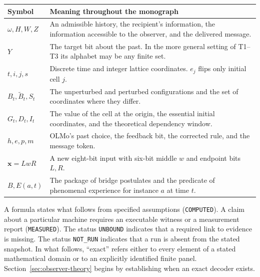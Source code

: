 \begin{center}\small
\begin{tabularx}{\linewidth}{@{}lX@{}}\toprule
Symbol & Meaning throughout the monograph \\\midrule
$\omega,H,W,Z$ & An admissible history, the recipient's information, the information accessible to the observer, and the delivered message.\\
$Y$ & The target bit about the past. In the more general setting of T1--T3 its alphabet may be any finite set.\\
$t,i,j,s$ & Discrete time and integer lattice coordinates. $e_j$ flips only initial cell $j$.\\
$B_t,\widetilde B_t,S_t$ & The unperturbed and perturbed configurations and the set of coordinates where they differ.\\
$G_t,D_t,I_t$ & The value of the cell at the origin, the essential initial coordinates, and the theoretical dependency window.\\
$h,e,p,m$ & OLMo's past choice, the feedback bit, the corrected rule, and the message token.\\
$\mathbf{x}=LwR$ & A new eight-bit input with six-bit middle $w$ and endpoint bits $L,R$.\\
$B,E(a,t)$ & The package of bridge postulates and the predicate of phenomenal experience for instance $a$ at time $t$.\\
\bottomrule\end{tabularx}
\end{center}

A formula states what follows from specified assumptions (\texttt{COMPUTED}). A claim about a particular machine requires an executable witness or a measurement report (\texttt{MEASURED}). The status \texttt{UNBOUND} indicates that a required link to evidence is missing. The status \texttt{NOT\_RUN} indicates that a run is absent from the stated snapshot. In what follows, “exact” refers either to every element of a stated mathematical domain or to an explicitly identified finite panel. Section~\ref{sec:observer-theory} begins by establishing when an exact decoder exists.
